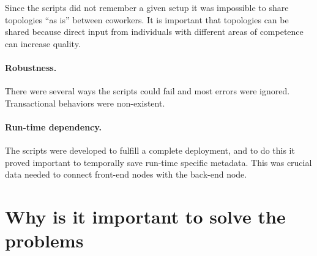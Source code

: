 Since the scripts did not remember a given setup it was impossible 
to share topologies ``as is'' between coworkers.
It is important that topologies can be shared because direct input from individuals
with different areas of competence can increase quality.

\paragraph{Robustness.}

There were several ways the scripts could fail and most errors were ignored.
Transactional behaviors were non-existent.

\paragraph{Run-time dependency.}

The scripts were developed to fulfill a complete deployment,
and to do this it proved important to temporally save run-time specific metadata.
This was crucial data needed to connect front-end nodes with the back-end node.


\section{Why is it important to solve the problems}



